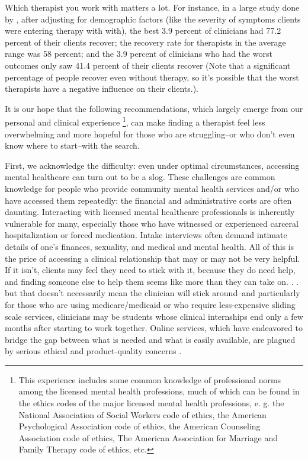 \documentclass[12pt,letterpaper]{book}
\begin{document}
Which therapist you work with matters a lot. For instance, in a large study done by \textcite{firth2019therapistEffects}, after adjusting for demographic factors (like the severity of symptoms clients were entering therapy with with), the best 3.9 percent of clinicians had 77.2 percent of their clients recover; the recovery rate for therapists in the average range was 58 percent; and the 3.9 percent of clinicians who had the worst outcomes only saw 41.4 percent of their clients recover (Note that a significant percentage of people recover even without therapy, so it's possible that the worst therapists have a negative influence on their clients.).

It is our hope that the following recommendations, which largely emerge from our personal and clinical experience \footnote{This experience includes some common knowledge of professional norms among the licensed mental health professions, much of which can be found in the ethics codes of the major licensed mental health professions, e. g. the National Association of Social Workers code of ethics, the American Psychological Association code of ethics, the American Counseling Association code of ethics, The American Association for Marriage and Family Therapy code of ethics, etc.}, can make finding a therapist feel less overwhelming and more hopeful for those who are struggling–or who don't even know where to start–with the search.

First, we acknowledge the difficulty: even under optimal circumstances, accessing mental healthcare can turn out to be a slog. These challenges are common knowledge for people who provide community mental health services and/or who have accessed them repeatedly: the financial and administrative costs are often daunting. Interacting with licensed mental healthcare professionals is inherently vulnerable for many, especially those who have witnessed or experienced carceral hospitalization or forced medication. Intake interviews often demand intimate details of one's finances, sexuality, and medical and mental health. All of this is the price of accessing a clinical relationship that may or may not be very helpful. If it isn't, clients may feel they need to stick with it, because they do need help, and finding someone else to help them seems like more than they can take on. . . but that doesn't necessarily mean the clinician will stick around–and particularly for those who are using medicare/medicaid or who require less-expensive sliding scale services, clinicians may be students whose clinical internships end only a few months after starting to work together. Online services, which have endeavored to bridge the gap between what is needed and what is easily available, are plagued by serious ethical and product-quality concerns \cite{betterhelp1,betterhelp2,betterhelp3,talkspace1,doneglobal1}.
\end{document}
